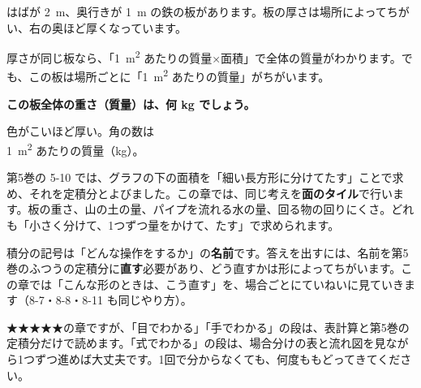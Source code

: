 \begin{hatena}
\noindent\begin{minipage}[c]{0.52\linewidth}
\raggedright
はばが \qty{2}{m}、奥行きが \qty{1}{m} の鉄の板があります。板の厚さは場所によってちがい、右の奥ほど厚くなっています。\par\vspace{4pt}
厚さが同じ板なら、「\qty{1}{m^2} あたりの質量×面積」で全体の質量がわかります。でも、この板は場所ごとに「\qty{1}{m^2} あたりの質量」がちがいます。\par\vspace{4pt}
\textbf{この板全体の重さ（質量）は、何 kg でしょう。}
\end{minipage}\hfill
\begin{minipage}[c]{0.45\linewidth}
\centering
{}\par\vspace{2pt}
{\footnotesize 色がこいほど厚い。角の数は\\\qty{1}{m^2} あたりの質量（kg）。}
\end{minipage}
\end{hatena}

\noindent 第5巻の 5-10 では、グラフの下の面積を「細い長方形に分けてたす」ことで求め、それを定積分とよびました。この章では、同じ考えを\textbf{面のタイル}で行います。板の重さ、山の土の量、パイプを流れる水の量、回る物の回りにくさ。どれも「小さく分けて、1つずつ量をかけて、たす」で求められます。

積分の記号は「どんな操作をするか」の\textbf{名前}です。答えを出すには、名前を第5巻のふつうの定積分に\textbf{直す}必要があり、どう直すかは形によってちがいます。この章では「こんな形のときは、こう直す」を、場合ごとにていねいに見ていきます（8-7・8-8・8-11 も同じやり方）。

★★★★★の章ですが、「目でわかる」「手でわかる」の段は、表計算と第5巻の定積分だけで読めます。「式でわかる」の段は、場合分けの表と流れ図を見ながら1つずつ進めば大丈夫です。1回で分からなくても、何度ももどってきてください。

